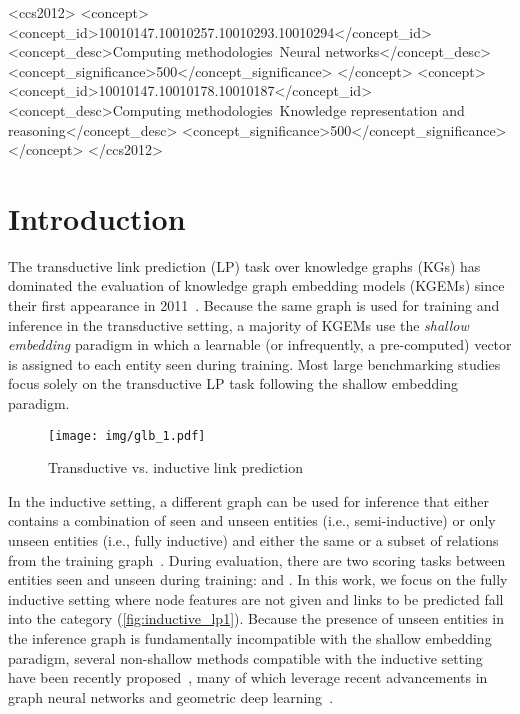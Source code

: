 \documentclass[sigconf,screen]{acmart}
\begin{document}
\begin{CCSXML}
<ccs2012>
<concept>
<concept_id>10010147.10010257.10010293.10010294</concept_id>
<concept_desc>Computing methodologies~Neural networks</concept_desc>
<concept_significance>500</concept_significance>
</concept>
<concept>
<concept_id>10010147.10010178.10010187</concept_id>
<concept_desc>Computing methodologies~Knowledge representation and reasoning</concept_desc>
<concept_significance>500</concept_significance>
</concept>
</ccs2012>
\end{CCSXML}





\maketitle

\section{Introduction}

The transductive link prediction (LP) task over knowledge graphs (KGs) has dominated the evaluation of knowledge graph embedding models (KGEMs) since their first appearance in 2011~\cite{DBLP:conf/icml/NickelTK11}.
Because the same graph is used for training and inference in the transductive setting, a majority of KGEMs use the \emph{shallow embedding} paradigm in which a learnable (or infrequently, a pre-computed) vector is assigned to each entity seen during training.
Most large benchmarking studies~\cite{ali2020benchmarking, Ruffinelli2020You, hu2020open} focus solely on the transductive LP task following the shallow embedding paradigm.

\begin{figure}[t]
    \centering
    \texttt{[image: img/glb\_1.pdf]}
    \caption{Transductive vs. inductive link prediction}
    \label{fig:inductive_lp1}
\end{figure}

In the inductive setting, a different graph can be used for inference that either contains a combination of seen and unseen entities (i.e., semi-inductive) or only unseen entities (i.e., fully inductive) and either the same or a subset of relations from the training graph~\cite{ali2021improving}.
During evaluation, there are two scoring tasks between entities seen and unseen during training:  and .
In this work, we focus on the fully inductive setting where node features are not given and links to be predicted fall into the  category (\autoref{fig:inductive_lp1}).
Because the presence of unseen entities in the inference graph is fundamentally incompatible with the shallow embedding paradigm, several non-shallow methods compatible with the inductive setting have been recently proposed~\cite{teru2020inductive,zhu2021neural,galkin2022nodepiece}, many of which leverage recent advancements in graph neural networks and geometric deep learning~\cite{bronstein2021geometric}.
\end{document}
